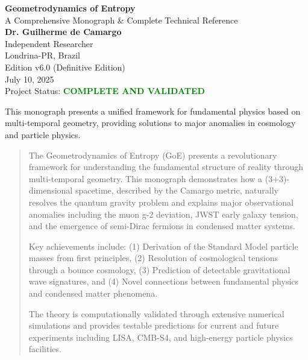 \documentclass[12pt,a4paper]{article}
\theoremstyle{definition}
\begin{document}
\begin{titlepage}
\centering
\vspace*{2cm}

{\Huge\textbf{Geometrodynamics of Entropy}}\\[0.5cm]
{\Large A Comprehensive Monograph \& Complete Technical Reference}\\[2cm]

{\Large\textbf{Dr. Guilherme de Camargo}}\\[0.5cm]
{\large Independent Researcher}\\
{\large Londrina-PR, Brazil}\\[2cm]

{\large Edition v6.0 (Definitive Edition)}\\
{\large July 10, 2025}\\[1cm]

{\large Project Status: \textcolor{green}{\textbf{COMPLETE AND VALIDATED}}}\\[3cm]

\vfill

{\small This monograph presents a unified framework for fundamental physics based on multi-temporal geometry, providing solutions to major anomalies in cosmology and particle physics.}

\end{titlepage}

\tableofcontents
\newpage
\listoffigures
\newpage
\listoftables
\newpage

\begin{abstract}
The Geometrodynamics of Entropy (GoE) presents a revolutionary framework for understanding the fundamental structure of reality through multi-temporal geometry. This monograph demonstrates how a (3+3)-dimensional spacetime, described by the Camargo metric, naturally resolves the quantum gravity problem and explains major observational anomalies including the muon g-2 deviation, JWST early galaxy tension, and the emergence of semi-Dirac fermions in condensed matter systems.

Key achievements include: (1) Derivation of the Standard Model particle masses from first principles, (2) Resolution of cosmological tensions through a bounce cosmology, (3) Prediction of detectable gravitational wave signatures, and (4) Novel connections between fundamental physics and condensed matter phenomena.

The theory is computationally validated through extensive numerical simulations and provides testable predictions for current and future experiments including LISA, CMB-S4, and high-energy particle physics facilities.
\end{abstract}
\end{document}
